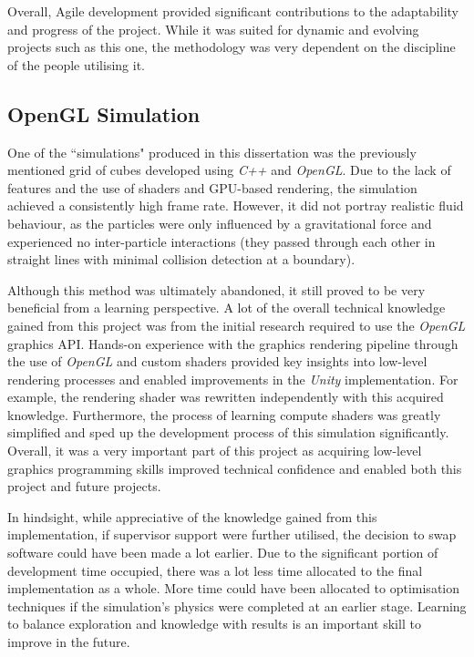\documentclass[a4paper, 12pt]{article}
\begin{document}
    Overall, Agile development provided significant contributions to the adaptability and progress of the project. While it was suited for dynamic and evolving projects such as this one, the methodology was very dependent on the discipline of the people utilising it.

    \subsection{OpenGL Simulation}

    One of the ``simulations" produced in this dissertation was the previously mentioned grid of cubes developed using \textit{C++} and \textit{OpenGL}. Due to the lack of features and the use of shaders and GPU-based rendering, the simulation achieved a consistently high frame rate. However, it did not portray realistic fluid behaviour, as the particles were only influenced by a gravitational force and experienced no inter-particle interactions (they passed through each other in straight lines with minimal collision detection at a boundary).

    Although this method was ultimately abandoned, it still proved to be very beneficial from a learning perspective. A lot of the overall technical knowledge gained from this project was from the initial research required to use the \textit{OpenGL} graphics API. Hands-on experience with the graphics rendering pipeline through the use of \textit{OpenGL} and custom shaders provided key insights into low-level rendering processes and enabled improvements in the \textit{Unity} implementation. For example, the rendering shader was rewritten independently with this acquired knowledge. Furthermore, the process of learning compute shaders was greatly simplified and sped up the development process of this simulation significantly. Overall, it was a very important part of this project as acquiring low-level graphics programming skills improved technical confidence and enabled both this project and future projects.

    In hindsight, while appreciative of the knowledge gained from this implementation, if supervisor support were further utilised, the decision to swap software could have been made a lot earlier. Due to the significant portion of development time occupied, there was a lot less time allocated to the final implementation as a whole. More time could have been allocated to optimisation techniques if the simulation's physics were completed at an earlier stage. Learning to balance exploration and knowledge with results is an important skill to improve in the future.
\end{document}
